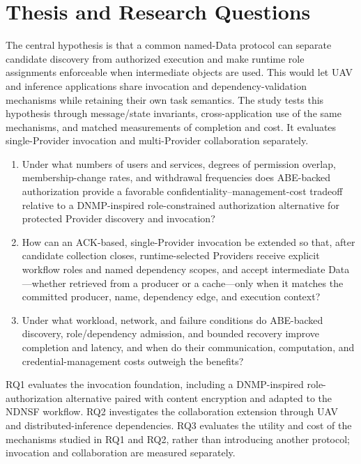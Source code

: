 \section{Thesis and Research Questions}
The central hypothesis is that a common named-Data protocol can separate candidate discovery from authorized execution and make runtime role assignments enforceable when intermediate objects are used. This would let UAV and inference applications share invocation and dependency-validation mechanisms while retaining their own task semantics. The study tests this hypothesis through message/state invariants, cross-application use of the same mechanisms, and matched measurements of completion and cost. It evaluates single-Provider invocation and multi-Provider collaboration separately.

\begin{enumerate}[label=RQ\arabic*.,leftmargin=*]
\item Under what numbers of users and services, degrees of permission overlap, membership-change rates, and withdrawal frequencies does ABE-backed authorization provide a favorable confidentiality--management-cost tradeoff relative to a DNMP-inspired role-constrained authorization alternative for protected Provider discovery and invocation?
\item How can an ACK-based, single-Provider invocation be extended so that, after candidate collection closes, runtime-selected Providers receive explicit workflow roles and named dependency scopes, and accept intermediate Data---whether retrieved from a producer or a cache---only when it matches the committed producer, name, dependency edge, and execution context?
\item Under what workload, network, and failure conditions do ABE-backed discovery, role/dependency admission, and bounded recovery improve completion and latency, and when do their communication, computation, and credential-management costs outweigh the benefits?
\end{enumerate}

RQ1 evaluates the invocation foundation, including a DNMP-inspired role-authorization alternative paired with content encryption and adapted to the NDNSF workflow. RQ2 investigates the collaboration extension through UAV and distributed-inference dependencies. RQ3 evaluates the utility and cost of the mechanisms studied in RQ1 and RQ2, rather than introducing another protocol; invocation and collaboration are measured separately.



